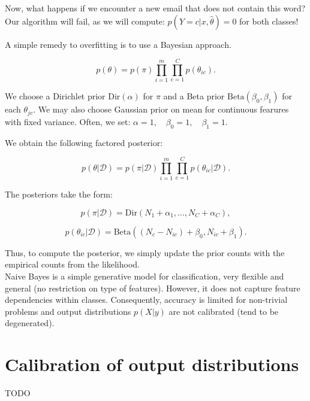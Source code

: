\documentclass[12pt, a4paper]{article}
\theoremstyle{definition}
\numberwithin{figure}{section}
\numberwithin{equation}{section}
\numberwithin{table}{section}
\begin{document}
Now, what happens if we encounter a new email that does not contain this word? Our algorithm will fail, as we will compute: $p(Y = c | x, \hat{\theta}) = 0$ for both classes!

A simple remedy to overfitting is to use a Bayesian approach.

\begin{equation}
    p(\theta) = p(\pi) \prod_{i=1}^{m} \prod_{c=1}^{C} p(\theta_{ic}).
    \label{eq:factored_prior}
\end{equation}

We choose a Dirichlet prior $\text{Dir}(\alpha)$ for $\pi$ and a Beta prior $\text{Beta}(\beta_0, \beta_1)$ for each $\theta_{jc}$. We may also choose Gaussian prior on mean for continuous fearures with fixed variance. Often, we set: $\alpha = 1, \quad \beta_0 = 1, \quad \beta_1 = 1$.

We obtain the following factored posterior:

\begin{equation}
    p(\theta | \mathcal{D}) = p(\pi | \mathcal{D}) \prod_{i=1}^{m} \prod_{c=1}^{C} p(\theta_{ic} | \mathcal{D}).
\end{equation}

The posteriors take the form:

\begin{equation}
    p(\pi | \mathcal{D}) = \text{Dir}(N_1 + \alpha_1, \dots, N_C + \alpha_C),
\end{equation}

\begin{equation}
    p(\theta_{ic} | \mathcal{D}) = \text{Beta}((N_c - N_{ic}) + \beta_0, N_{ic} + \beta_1).
\end{equation}

Thus, to compute the posterior, we simply update the prior counts with the empirical counts from the likelihood.\\


Naive Bayes is a simple generative model for classification, very flexible and general (no restriction on type of features). However, it does not capture feature dependencies within classes. Consequently, accuracy is limited for non-trivial problems and output distributions $p(X|y)$ are not calibrated (tend to be degenerated).


\section{Calibration of output distributions}
TODO
\end{document}
